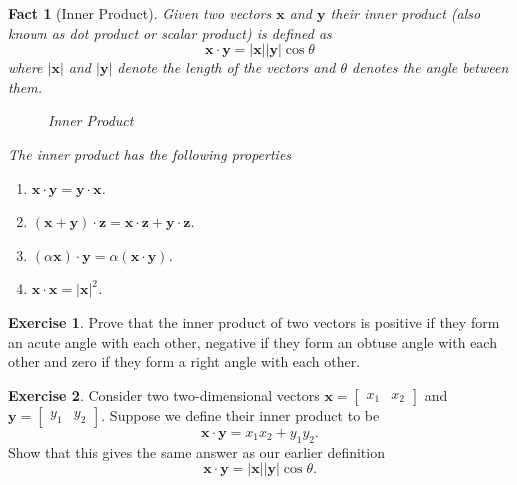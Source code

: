 \documentclass[11pt,reqno,openany]{amsbook}
\numberwithin{figure}{chapter}
\numberwithin{equation}{chapter}
\theoremstyle{plain}
\newtheorem{fact}{Fact}[chapter]
\theoremstyle{definition}
\newtheorem{xca}{Exercise}[chapter]
\renewcommand{\vec}[1]{\mathbf{#1}}
\newcommand{\dotprod}[2]{{#1}\cdot{#2}}
\begin{document}
\begin{fact}[Inner Product]
  Given two vectors $\vec{x}$ and $\vec{y}$ their inner product (also
  known as dot product or scalar product) is defined as
  \[\dotprod{\vec{x}}{\vec{y}} = |\vec{x}||\vec{y}| \cos \theta\]
  where $|\vec{x}|$ and $|\vec{y}|$ denote the length of the vectors
  and $\theta$ denotes the angle between them.

  \begin{figure}[h]
  \caption{Inner Product}
  \end{figure}

  The inner product has the following properties
  \begin{enumerate}
  \item $\dotprod{\vec{x}}{\vec{y}}=\dotprod{\vec{y}}{\vec{x}}$.
  \item $\dotprod{(\vec{x}+\vec{y})}{\vec{z}}
    = \dotprod{\vec{x}}{\vec{z}} + \dotprod{\vec{y}}{\vec{z}}$.
  \item $\dotprod{(\alpha\vec{x})}{\vec{y}} =
    \alpha(\dotprod{\vec{x}}{\vec{y}})$.
  \item $\dotprod{\vec{x}}{\vec{x}}=|\vec{x}|^2$.
  \end{enumerate}
\end{fact}

\begin{xca}
  Prove that the inner product of two vectors is positive if they form
  an acute angle with each other, negative if they form an obtuse
  angle with each other and zero if they form a right angle with each other.
\end{xca}

\begin{xca}
  Consider two two-dimensional vectors $\vec{x}=\begin{bmatrix} x_1 &
    x_2 \end{bmatrix}$ and $\vec{y} = \begin{bmatrix} y_1 &
    y_2 \end{bmatrix}$. Suppose we define their inner product to be
  \[\dotprod{\vec{x}}{\vec{y}} = x_1 x_2 + y_1 y_2.\]
  Show that this gives the same answer as our earlier definition
  \[\dotprod{\vec{x}}{\vec{y}} = |\vec{x}||\vec{y}|\cos \theta.\]
\end{xca}
\end{document}
